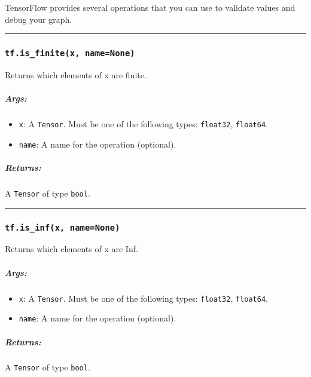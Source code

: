 TensorFlow provides several operations that you can use to validate
values and debug your graph.

\begin{center}\rule{0.5\linewidth}{\linethickness}\end{center}

\subsubsection{\texorpdfstring{\texttt{tf.is\_finite(x,\ name=None)}
}{tf.is\_finite(x, name=None) }}\label{tf.isux5ffinitex-namenone}

Returns which elements of x are finite.

\subparagraph{Args: }\label{args-16}

\begin{itemize}
\tightlist
\item
  \texttt{x}: A \texttt{Tensor}. Must be one of the following types:
  \texttt{float32}, \texttt{float64}.
\item
  \texttt{name}: A name for the operation (optional).
\end{itemize}

\subparagraph{Returns: }\label{returns-16}

A \texttt{Tensor} of type \texttt{bool}.

\begin{center}\rule{0.5\linewidth}{\linethickness}\end{center}

\subsubsection{\texorpdfstring{\texttt{tf.is\_inf(x,\ name=None)}
}{tf.is\_inf(x, name=None) }}\label{tf.isux5finfx-namenone}

Returns which elements of x are Inf.

\subparagraph{Args: }\label{args-17}

\begin{itemize}
\tightlist
\item
  \texttt{x}: A \texttt{Tensor}. Must be one of the following types:
  \texttt{float32}, \texttt{float64}.
\item
  \texttt{name}: A name for the operation (optional).
\end{itemize}

\subparagraph{Returns: }\label{returns-17}

A \texttt{Tensor} of type \texttt{bool}.

